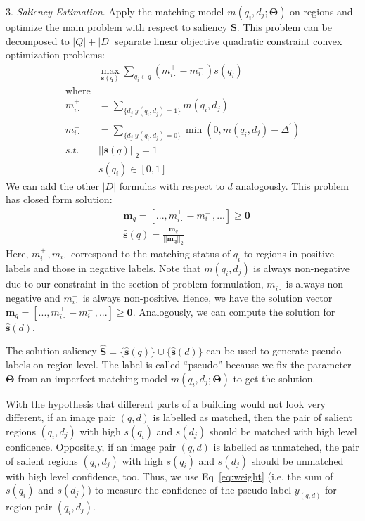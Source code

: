 3. \emph{Saliency Estimation}. Apply the matching model $m(q_i, d_j; \mathbf{\Theta})$ on regions and optimize the main problem with respect to saliency $\mathbf{S}$. This problem can be decomposed to $|Q|+|D|$ separate linear objective quadratic constraint convex optimization problems:
\begin{equation}
\label{eq:decomposed_problem}
\begin{aligned}
& \max_{\mathbf{s}(q)} \sum_{q_i \in q} (m_{i\cdot}^+ - m_{i\cdot}^-) s(q_i) \\
\text{where} \\
m_{i\cdot}^+& = \sum_{\{d_j|y(q_i,d_j)=1\}} m(q_i,d_j) \\
m_{i\cdot}^-&=\sum_{\{d_j|y(q_i,d_j)=0\}} \min(0, m(q_i,d_j)-\Delta^{'})\\
s.t.& ||\mathbf{s}(q)||_2 = 1\\
& s(q_i)\in [0,1]
\end{aligned}
\end{equation}
We can add the other $|D|$ formulas with respect to $d$ analogously.
This problem has closed form solution:
\begin{equation}
\label{eq:closed_form_solution}
\begin{aligned}
& \mathbf{m}_q = [..., m_{i\cdot }^+ - m_{i\cdot}^-, ...] \geq \mathbf{0} \\
& \hat{\mathbf{s}}(q) = \frac{\mathbf{m}_q}{||\mathbf{m_q}||_2}
\end{aligned}
\end{equation}
Here, $m_{i\cdot }^+, m_{i\cdot}^-$ correspond to the matching status of $q_i$ to regions in positive labels and those in negative labels. 
Note that $m(q_i, d_j)$ is always non-negative due to our constraint in the section of problem formulation, $m_{i\cdot }^+$ is always non-negative and $m_{i\cdot }^-$ is always non-positive. Hence, we have the solution vector  $ \mathbf{m}_q = [..., m_{i\cdot }^+ - m_{i\cdot}^-, ...] \geq \mathbf{0} $. Analogously, we can compute the solution for $\hat{\mathbf{s}}(d)$.

The solution saliency $\hat{\mathbf{S}} = \{\hat{\mathbf{s}}(q)\} \cup \{\hat{\mathbf{s}}(d)\}$ can be used to generate pseudo labels on region level. 
The label is called ``pseudo'' because we fix the parameter $\mathbf{\Theta}$ from an imperfect matching model $m(q_i, d_j; \mathbf{\Theta})$ to get the solution. 

With the hypothesis that different parts of a building would not look very different, if an image pair $(q,d)$ is labelled as matched, then the pair of salient regions $(q_i, d_j)$ with high $s(q_i)$ and $s(d_j)$ should be matched with high level confidence. 
Oppositely,  if an image pair $(q,d)$ is labelled as unmatched, the pair of salient regions $(q_i, d_j)$ with high $s(q_i)$ and $s(d_j)$ should be unmatched with high level confidence, too. 
Thus, we use Eq~\eqref{eq:weight} (i.e. the sum of $s(q_i)$ and $s(d_j)$) to measure the confidence of the pseudo label $y_{(q,d)}$ for region pair $(q_i, d_j)$.

